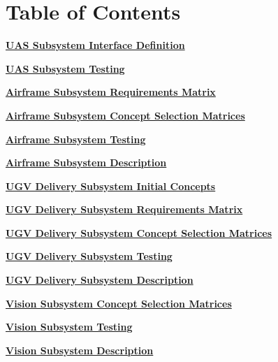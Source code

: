 \documentclass[]{article}
\newcounter{includepdfpage}
\newcommand{\pdflink}[2]{
\hyperlink{#1.1}{\textbf{#2}}
}
\newcommand{\pdflinkdoc}[2]{

}
\begin{document}



\section{Table of Contents}

\pdflink{ss_def}{UAS Subsystem Interface Definition}

\pdflink{ss_test}{UAS Subsystem Testing}


\pdflink{af_reqmat}{Airframe Subsystem Requirements Matrix}

\pdflink{af_select}{Airframe Subsystem Concept Selection Matrices}

\pdflink{af_test}{Airframe Subsystem Testing}

\pdflink{af_def}{Airframe Subsystem Description}


\pdflink{ugv_init}{UGV Delivery Subsystem Initial Concepts}

\pdflink{ugv_reqmat}{UGV Delivery Subsystem Requirements Matrix}

\pdflink{ugv_select}{UGV Delivery Subsystem Concept Selection Matrices}

\pdflink{ugv_test}{UGV Delivery Subsystem Testing}

\pdflink{ugv_def}{UGV Delivery Subsystem Description}


\pdflink{vis_select}{Vision Subsystem Concept Selection Matrices}

\pdflink{vis_test}{Vision Subsystem Testing}

\pdflink{vis_def}{Vision Subsystem Description}


\pdflinkdoc{ss_def}{./SubsystemInterfaces/SubsystemInterfacesDescription/SubsystemInterfaceDefinitions.pdf}
\pdflinkdoc{ss_test}{./SubsystemInterfaces/SITestProceduresAndResults/SITestProceduresAndResults.pdf}

\pdflinkdoc{af_reqmat}{./Airframe/AirframeRequirementsMatrix/AirframeRequirementsMatrix.pdf}
\pdflinkdoc{af_select}{./Airframe/AirframeConceptSelectionMatrices/AirframeConceptSelectionMatrices.pdf}
\pdflinkdoc{af_test}{./Airframe/AirframeConceptTestProceduresAndResults/AirframeConceptTestProceduresAndResults.pdf}
\pdflinkdoc{af_def}{./Airframe/AirframeDescription/AirframeDescription.pdf}

\pdflinkdoc{ugv_init}{./UGV/UGVInitialConcepts/InitialConceptGeneration.pdf}
\pdflinkdoc{ugv_reqmat}{./UGV/UGVRequirmentsMatrix/main.pdf}
\pdflinkdoc{ugv_select}{./UGV/UGVConceptSelectionMatrices/UGVConceptSelectionMatrices.pdf}
\pdflinkdoc{ugv_test}{./UGV/UGVConceptTestProceduresAndResults/UGVConceptTestProceduresAndResults.pdf}
\pdflinkdoc{ugv_def}{./UGV/UGVDescription/UGVConceptDescription.pdf}

\pdflinkdoc{vis_select}{./VisionConceptDescription/VisionConceptSelectionMatrices/VisionConceptSelectionMatrices.pdf}
\pdflinkdoc{vis_test}{./VisionConceptDescription/VisionConceptTestProceduresAndResults/VisionTestProceduresAndResults.pdf}
\pdflinkdoc{vis_def}{./VisionConceptDescription/VisionDescription/VisionConceptDescription.pdf}
\end{document}
